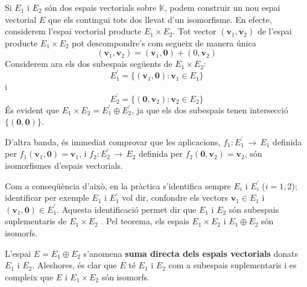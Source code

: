 \begin{observacio}
Si $E_{1}$ i $E_{2}$ són dos espais vectorials sobre $%
\mathbb{K}$, podem construir un nou espai vectorial $E$ que
els contingui tots dos llevat d'un isomorfisme. En efecte, considerem
l'espai vectorial producte $E_{1}\times E_{2}$. Tot
vector $(\mathbf{v}_{1},\mathbf{v}_{2})$ de l’espai producte $E%
_{1}\times E_{2}$ pot descompondre's com segueix de manera única%
\begin{equation*}
(\mathbf{v}_{1},\mathbf{v}_{2})=(\mathbf{v}_{1},\mathbf{0})+(0,\mathbf{v}%
_{2})
\end{equation*}%
Considerem ara els dos subespais següents de $E_{1}\times 
E_{2}$: 
\begin{equation*}
E_{1}^{\prime }=\{(\mathbf{v}_{1},\mathbf{0}):\mathbf{v}_{1}\in 
E_{1}\}
\end{equation*}%
i 
\begin{equation*}
E_{2}^{\prime }=\{(\mathbf{0},\mathbf{v}_{2}):\mathbf{v}_{2}\in 
E_{2}\}
\end{equation*}%
És evident que $E_{1}\times E_{2}=E_{1}^{\prime
}\oplus E_{2}^{\prime }$, ja que els dos subespais tenen
intersecció $\{(\mathbf{0},\mathbf{0})\}$.

D’altra banda, és immediat comprovar que les aplicacions, $f_{1}:E_{1}^{\prime }\,\rightarrow \,E_{1}$ definida per $f_{1}(\mathbf{v}%
_{1},\mathbf{0})=\mathbf{v}_{1}$, i $f_{2}:E_{2}^{\prime
}\,\rightarrow \,E_{2}$ definida per $f_{2}(\mathbf{0},\mathbf{v}%
_{2})=\mathbf{v}_{2}$, són isomorfismes d’espais vectorials.

Com a conseqüència d’això, en la pràctica s'identifica sempre $E_{i}$ i $E_{i}^{\prime }$ ($i=1,2$); identificar per exemple $%
E_{1}$ i $E_{1}^{\prime }$ vol dir, confondre els
vectors $\mathbf{v}_{1}\in E_{1}$ i $(\mathbf{v}_{1},\mathbf{0}%
)\in E_{1}^{\prime }$. Aquesta identificació permet dir que $%
E_{1}$ i $E_{2}$ són subespais suplementaris de $%
E_{1}\times E_{2}$ . Pel teorema, els espais $E_{1}\times E_{2}$ i $E_{1}\oplus E_{2}$ són
isomorfs. \newline

L'espai $E=E_{1}\oplus E_{2}$ s’anomena \textbf{%
suma directa dels espais vectorials} donats $E_{1}$ i $E_{2}$. Aleshores, és clar que $E$ té $E_{1}$ i $%
E_{2}$ com a subespais suplementaris i es compleix que $E$
i $E_{1}\times E_{2}$ són isomorfs.


\end{observacio}
